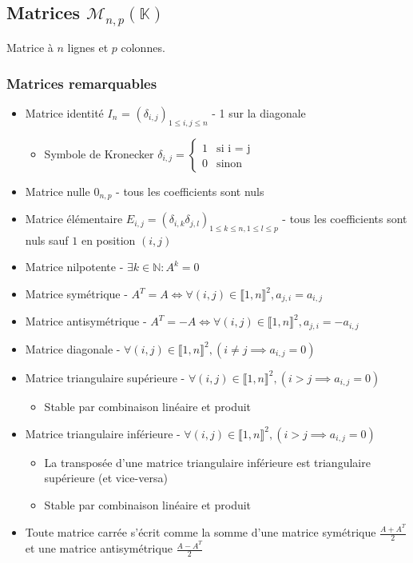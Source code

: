 \documentclass[openany]{book}
\begin{document}
\subsection{Matrices $\mathcal{M}_{n, p}(\mathbb{K})$}
Matrice à $n$ lignes et $p$ colonnes. 

\subsubsection{Matrices remarquables}
\begin{itemize}
    \item Matrice identité $I_n$ = $(\delta_{i, j})_{1\leq i,j \leq n}$ - 1 sur la diagonale
        \begin{itemize}
            \item Symbole de Kronecker $\delta_{i, j} = \begin{cases} 1 &\text{si i = j} \\ 0 &\text{sinon} \end{cases} $
        \end{itemize}
    \item Matrice nulle $0_{n, p}$ - tous les coefficients sont nuls
    \item Matrice élémentaire $E_{i, j} = (\delta_{i, k}\delta_{j, l})_{1\leq k\leq n, 1 \leq l \leq p }$ - tous les coefficients sont nuls sauf $1$ en position $(i, j)$
    \item Matrice nilpotente - $ \exists k \in \mathbb{N} : A^k = 0 $
    \item Matrice symétrique - $ A^T = A \iff \forall(i,j)\in \llbracket 1, n \rrbracket^2, a_{j, i} = a_{i, j} $
    \item Matrice antisymétrique - $ A^T = -A \iff \forall(i,j)\in \llbracket 1, n \rrbracket^2, a_{j, i} = -a_{i, j} $
    \item Matrice diagonale - $ \forall(i,j)\in \llbracket 1, n \rrbracket^2, (i\neq j \implies a_{i, j} = 0) $
    \item Matrice triangulaire supérieure - $ \forall(i,j)\in \llbracket 1, n \rrbracket^2, (i > j \implies a_{i, j} = 0) $
        \begin{itemize}
            \item Stable par combinaison linéaire et produit
        \end{itemize}
    \item Matrice triangulaire inférieure - $ \forall(i,j)\in \llbracket 1, n \rrbracket^2, (i > j \implies a_{i, j} = 0) $
        \begin{itemize}
            \item La transposée d'une matrice triangulaire inférieure est triangulaire supérieure (et vice-versa)
            \item Stable par combinaison linéaire et produit
        \end{itemize}
    \item Toute matrice carrée s'écrit comme la somme d'une matrice symétrique $ \frac{A + A^T}{2} $ et une matrice antisymétrique $ \frac{A - A^T}{2} $
\end{itemize}
\end{document}

